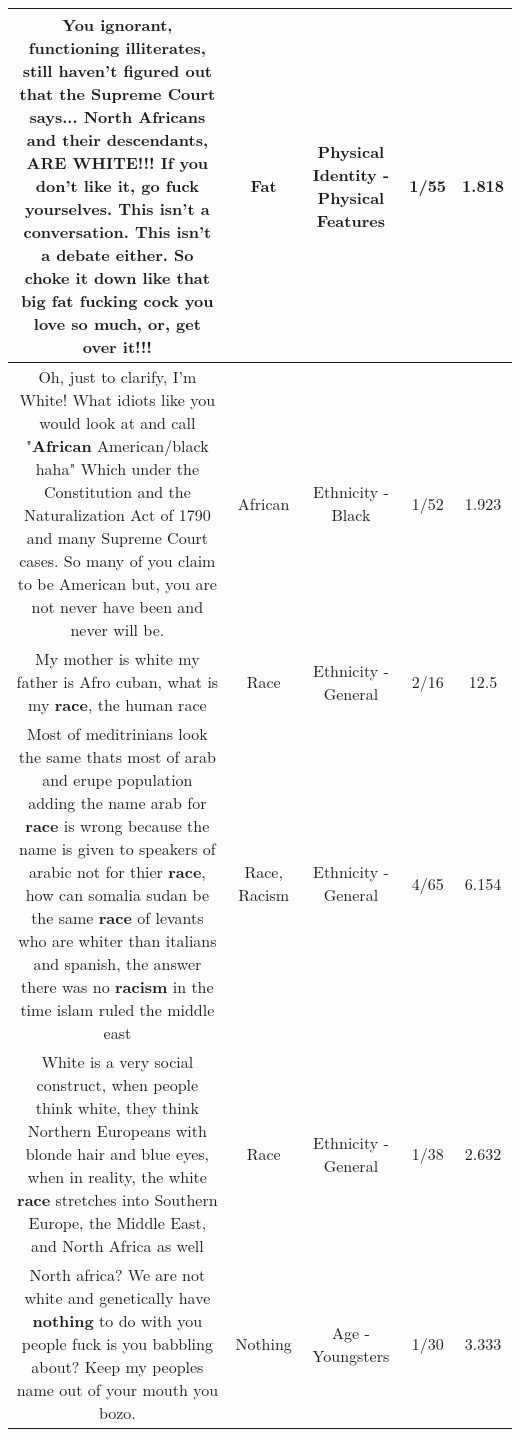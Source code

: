 \documentclass[11pt]{article}
\newlength\mylength
\begin{document}
\begin{center}
\begin{longtable}{|C{.65\mylength}|C{.30\mylength}|C{.12\mylength}|C{.12\mylength}|C{.12\mylength}|}
  \small You ignorant, functioning illiterates, still haven't figured out that the Supreme Court says... North Africans and their descendants, ARE WHITE!!! If you don't like it, go fuck yourselves. This isn't a conversation. This isn't a debate either. So choke it down like that big \textbf{fat} fucking cock you love so much, or, get over it!!!\normalsize   & Fat & Physical Identity - Physical Features & 1/55 & 1.818 \\  \hline
  \small Oh, just to clarify, I'm White! What idiots like you would look at and call "\textbf{African} American/black haha" Which under the Constitution and the Naturalization  Act  of 1790 and many Supreme Court cases. So many of you claim to be American but, you are not never have been and never will be.\normalsize   & African & Ethnicity - Black & 1/52 & 1.923 \\  \hline
  \small My mother is white my father is Afro cuban, what is my \textbf{race}, the human race\normalsize   & Race & Ethnicity - General & 2/16 & 12.5 \\  \hline
  \small Most of meditrinians look the same thats most of arab and erupe population adding the name arab for \textbf{race} is wrong because the name is given to speakers of  arabic not for thier \textbf{race}, how can somalia sudan be the same \textbf{race} of levants who are whiter than italians and spanish, the answer there was no \textbf{racism} in the time islam ruled the middle east\normalsize   & Race, Racism & Ethnicity - General & 4/65 & 6.154 \\  \hline
  \small White is a very social construct, when people think white, they think Northern Europeans with blonde hair and blue eyes, when in reality, the white \textbf{race} stretches into Southern Europe, the Middle East, and North Africa as well\normalsize   & Race & Ethnicity - General & 1/38 & 2.632 \\  \hline
  \small North africa? We are not white and genetically have \textbf{nothing} to do with you people fuck is you babbling about? Keep my peoples name out of your mouth you bozo.\normalsize   & Nothing & Age - Youngsters & 1/30 & 3.333 \\  \hline

\end{longtable}
\end{center}
\end{document}

